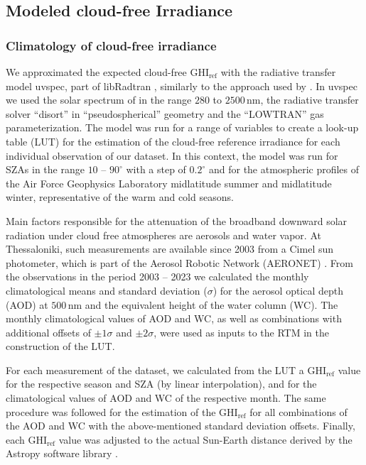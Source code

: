 \documentclass[preprint, 5p,
authoryear]{elsarticle} %
\begin{document}
\hypertarget{rtmcs}{%
\subsection{Modeled cloud-free Irradiance}\label{rtmcs}}

\hypertarget{climatology-of-cloud-free-irradiance}{%
\subsubsection{Climatology of cloud-free
irradiance}\label{climatology-of-cloud-free-irradiance}}

We approximated the expected cloud-free \(\text{GHI}_\text{ref}\) with
the radiative transfer model uvspec, part of libRadtran
\citep{Emde2016}, similarly to the approach used by
\citet{Vamvakas2020}. In uvspec we used the solar spectrum of
\citet{Kurucz1994} in the range \(280\) to \(2500\,\text{nm}\), the
radiative transfer solver ``disort'' in ``pseudospherical'' geometry and
the ``LOWTRAN'' gas parameterization. The model was run for a range of
variables to create a look-up table (LUT) for the estimation of the
cloud-free reference irradiance for each individual observation of our
dataset. In this context, the model was run for SZAs in the range \(10\)
-- \(90^\circ\) with a step of \(0.2^\circ\) and for the atmospheric
profiles of the Air Force Geophysics Laboratory \citep{Anderson1986}
midlatitude summer and midlatitude winter, representative of the warm
and cold seasons.

Main factors responsible for the attenuation of the broadband downward
solar radiation under cloud free atmospheres are aerosols and water
vapor. At Thessaloniki, such measurements are available since 2003 from
a Cimel sun photometer, which is part of the Aerosol Robotic Network
(AERONET) \citep{Giles2019, Buis1998}. From the observations in the
period 2003 -- 2023 we calculated the monthly climatological means and
standard deviation (\(\sigma\)) for the aerosol optical depth (AOD) at
\(500\,\text{nm}\) and the equivalent height of the water column (WC).
The monthly climatological values of AOD and WC, as well as combinations
with additional offsets of \(\pm1\sigma\) and \(\pm2\sigma\), were used
as inputs to the RTM in the construction of the LUT.

For each measurement of the dataset, we calculated from the LUT a
\(\text{GHI}_\text{ref}\) value for the respective season and SZA (by
linear interpolation), and for the climatological values of AOD and WC
of the respective month. The same procedure was followed for the
estimation of the \(\text{GHI}_\text{ref}\) for all combinations of the
AOD and WC with the above-mentioned standard deviation offsets. Finally,
each \(\text{GHI}_\text{ref}\) value was adjusted to the actual
Sun-Earth distance derived by the Astropy software library
\citep{AstropyCollaboration2022}.
\end{document}
